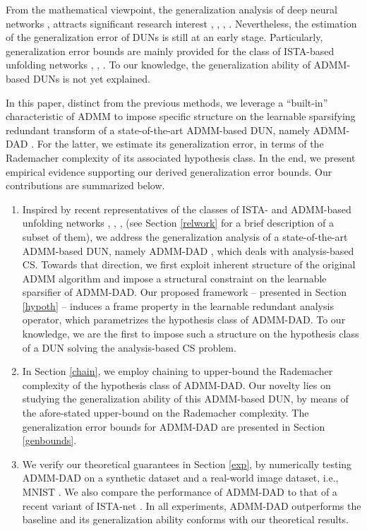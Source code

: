 \documentclass[preprint,12pt]{elsarticle}
\begin{document}
\par From the mathematical viewpoint, the generalization analysis of deep neural networks \cite{shalev}, \cite{mohri} attracts significant research interest \cite{gensgd}, \cite{wass}, \cite{arora}, \cite{spectralbound}. Nevertheless, the estimation of the generalization error of DUNs is still at an early stage. Particularly, generalization error bounds are mainly provided for the class of ISTA-based unfolding networks \cite{istagen}, \cite{deeprnn}, \cite{unfoldrnn}. To our knowledge,
the generalization ability of ADMM-based DUNs is not yet explained.
\par In this paper, distinct from the previous methods, we leverage a ``built-in'' characteristic of ADMM to impose specific structure on the learnable sparsifying redundant transform of a state-of-the-art  ADMM-based DUN, namely ADMM-DAD \cite{admmdad}. For the latter, we estimate its generalization error, in terms of the Rademacher complexity of its associated hypothesis class. In the end, we present empirical evidence supporting our derived generalization error bounds. Our contributions are summarized below.
\begin{enumerate}
    \item Inspired by recent representatives of the classes of ISTA- and ADMM-based unfolding networks \cite{istagen}, \cite{admm-net}, \cite{ladmm}, \cite{admmdad} (see Section \ref{relwork} for a brief description of a subset of them), we address the generalization analysis of a state-of-the-art  ADMM-based DUN, namely ADMM-DAD \cite{admmdad}, which deals with analysis-based CS. Towards that direction, we first exploit inherent structure of the original ADMM algorithm and impose a structural constraint on the learnable sparsifier of ADMM-DAD. Our proposed framework -- presented in Section \ref{hypoth} -- induces a frame property in the learnable redundant analysis operator, which parametrizes the hypothesis class of ADMM-DAD. To our knowledge, we are the first to impose such a structure on the hypothesis class of a DUN solving the analysis-based CS problem.
    \item In Section \ref{chain}, we employ chaining \cite[Chapter 8]{vershynin} to upper-bound the Rademacher complexity \cite{bartlett} of the hypothesis class of ADMM-DAD. Our novelty lies on studying the generalization ability of this ADMM-based DUN, by means of the afore-stated upper-bound on the Rademacher complexity. The generalization error bounds for ADMM-DAD are presented in Section \ref{genbounds}.
    \item We verify our theoretical guarantees in Section \ref{exp}, by numerically testing ADMM-DAD on a synthetic dataset and a real-world image dataset, i.e., MNIST \cite{mnist}. We also compare the performance of ADMM-DAD to that of a recent variant of ISTA-net \cite{istagen}. In all experiments, ADMM-DAD outperforms the baseline and its generalization ability conforms with our theoretical results.
\end{enumerate}
\end{document}
